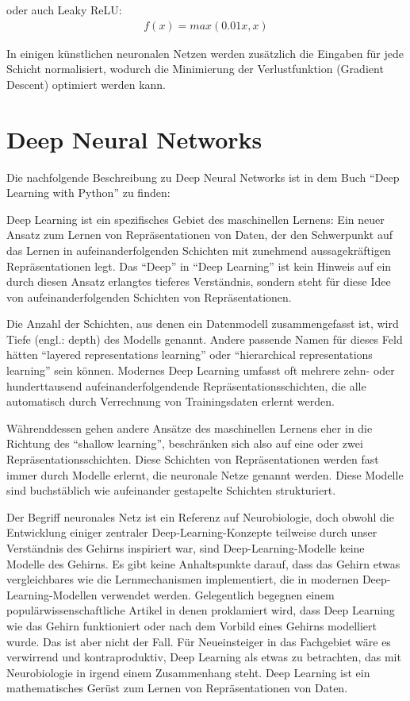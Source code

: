 oder auch Leaky ReLU:
\begin{align}
f(x) = max(0.01x, x)
\end{align}

In einigen künstlichen neuronalen Netzen werden zusätzlich die Eingaben für jede Schicht normalisiert, wodurch die Minimierung der Verlustfunktion (Gradient Descent) optimiert werden kann.

\section{Deep Neural Networks}
\label{sec:dnn}

Die nachfolgende Beschreibung zu Deep Neural Networks ist in dem Buch ``Deep Learning with Python'' \cite{chollet2021deep} zu finden:

Deep Learning ist ein spezifisches Gebiet des maschinellen Lernens: Ein neuer Ansatz zum Lernen von Repräsentationen von Daten, der den Schwerpunkt auf das Lernen in aufeinanderfolgenden Schichten mit zunehmend aussagekräftigen Repräsentationen legt. Das ``Deep'' in ``Deep Learning'' ist kein Hinweis auf ein durch diesen Ansatz erlangtes tieferes Verständnis, sondern steht für diese Idee von aufeinanderfolgenden Schichten von Repräsentationen.

Die Anzahl der Schichten, aus denen ein Datenmodell zusammengefasst ist, wird Tiefe (engl.: depth) des Modells genannt. Andere passende Namen für dieses Feld hätten ``layered representations learning'' oder ``hierarchical representations learning'' sein können. Modernes Deep Learning umfasst oft mehrere zehn- oder hunderttausend aufeinanderfolgendende Repräsentationsschichten, die alle automatisch durch Verrechnung von Trainingsdaten erlernt werden.

Währenddessen gehen andere Ansätze des maschinellen Lernens eher in die Richtung des ``shallow learning'', beschränken sich also auf eine oder zwei Repräsentationsschichten. Diese Schichten von Repräsentationen werden fast immer durch Modelle erlernt, die neuronale Netze genannt werden. Diese Modelle sind buchstäblich wie aufeinander gestapelte Schichten strukturiert.

Der Begriff neuronales Netz ist ein Referenz auf Neurobiologie, doch obwohl die Entwicklung einiger zentraler Deep-Learning-Konzepte teilweise durch unser Verständnis des Gehirns inspiriert war, sind Deep-Learning-Modelle keine Modelle des Gehirns. Es gibt keine Anhaltspunkte darauf, dass das Gehirn etwas vergleichbares wie die Lernmechanismen implementiert, die in modernen Deep-Learning-Modellen verwendet werden. Gelegentlich begegnen einem populärwissenschaftliche Artikel in denen proklamiert wird, dass Deep Learning wie das Gehirn funktioniert oder nach dem Vorbild eines Gehirns modelliert wurde. Das ist aber nicht der Fall. Für Neueinsteiger in das Fachgebiet wäre es verwirrend und kontraproduktiv, Deep Learning als etwas zu betrachten, das mit Neurobiologie in irgend einem Zusammenhang steht. Deep Learning ist ein mathematisches Gerüst zum Lernen von Repräsentationen von Daten.

